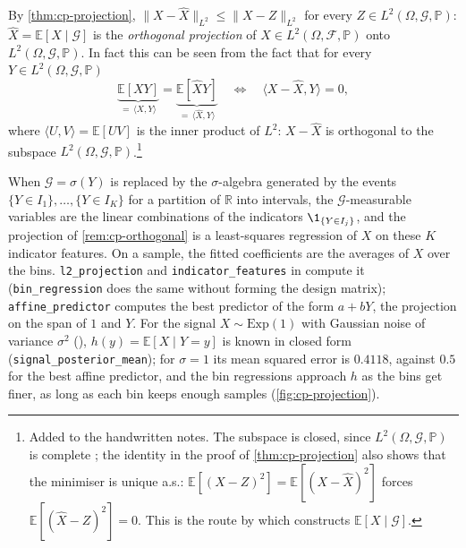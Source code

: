 \begin{remark}\label{rem:cp-orthogonal}
By \cref{thm:cp-projection}, $\|X-\hat X\|_{L^2}\le\|X-Z\|_{L^2}$ for every
$Z\in L^2(\Omega,\mathcal G,\mathbb P)$: $\hat X=\mathbb E[X\mid\mathcal G]$ is the
\emph{orthogonal projection} of $X\in L^2(\Omega,\mathcal F,\mathbb P)$ onto
$L^2(\Omega,\mathcal G,\mathbb P)$. In fact this can be seen from the fact that for every
$Y\in L^2(\Omega,\mathcal G,\mathbb P)$
\[
  \underbrace{\mathbb E[XY]}_{=\,\langle X,Y\rangle}=\underbrace{\mathbb E[\hat XY]}_{=\,\langle\hat X,Y\rangle}
  \quad\Longleftrightarrow\quad\langle X-\hat X,Y\rangle=0,
\]
where $\langle U,V\rangle=\mathbb E[UV]$ is the inner product of $L^2$: $X-\hat X$ is orthogonal to
the subspace $L^2(\Omega,\mathcal G,\mathbb P)$.\footnote{Added to the handwritten notes. The
subspace is closed, since $L^2(\Omega,\mathcal G,\mathbb P)$ is complete \citep[Theorem~3.11]{rudin-rca};
the identity in the proof of \cref{thm:cp-projection} also shows that the minimiser is unique
a.s.: $\mathbb E[(X-Z)^2]=\mathbb E[(X-\hat X)^2]$ forces $\mathbb E[(\hat X-Z)^2]=0$. This
is the route by which \citet[Chapter~9]{williams} constructs $\mathbb E[X\mid\mathcal G]$.}
\end{remark}

\begin{remark}[computational]\label{rem:cp-code-projection}
When $\mathcal G=\sigma(Y)$ is replaced by the $\sigma$-algebra generated by the events
$\{Y\in I_1\},\dots,\{Y\in I_K\}$ for a partition of $\mathbb R$ into intervals, the
$\mathcal G$-measurable variables are the linear combinations of the indicators
$\1_{\{Y\in I_j\}}$, and the projection of \cref{rem:cp-orthogonal} is a least-squares regression
of $X$ on these $K$ indicator features. On a sample, the fitted coefficients are the averages of
$X$ over the bins. \texttt{l2\_projection} and \texttt{indicator\_features} in
 compute it (\texttt{bin\_regression} does the same
without forming the design matrix); \texttt{affine\_predictor} computes the best
predictor of the form $a+bY$, the projection on the span of $1$ and $Y$. For the signal
$X\sim\mathrm{Exp}(1)$ with Gaussian noise of variance $\sigma^2$ (),
$h(y)=\mathbb E[X\mid Y=y]$ is known in closed form (\texttt{signal\_posterior\_mean}); for
$\sigma=1$ its mean squared error is $0.4118$, against $0.5$ for the best affine predictor, and
the bin regressions approach $h$ as the bins get finer, as long as each bin keeps enough samples
(\cref{fig:cp-projection}).
\end{remark}


